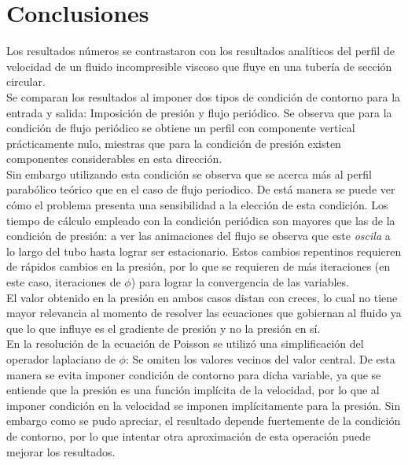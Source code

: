 \section{Conclusiones}

Los resultados números se contrastaron con los resultados analíticos del perfil de velocidad de un fluido incompresible viscoso que fluye en una tubería de sección circular. \\

Se comparan los resultados al imponer dos tipos de condición de contorno para la entrada y salida: Imposición de presión y flujo periódico. Se observa que para la condición de flujo periódico se obtiene un perfil con componente vertical prácticamente nulo, miestras que para la condición de presión existen componentes considerables en esta dirección. \\

Sin embargo utilizando esta condición se observa que se acerca más al perfil parabólico teórico que en el caso de flujo periodico. De está manera se puede ver cómo el problema presenta una sensibilidad a la elección de esta condición. Los tiempo de cálculo empleado con la condición periódica son mayores que las de la condición de presión: a ver las animaciones del flujo se observa que este \textit{oscila} a lo largo del tubo hasta lograr ser estacionario. Estos cambios repentinos requieren de rápidos cambios en la presión, por lo que se requieren de más iteraciones (en este caso, iteraciones de $\phi$) para lograr la convergencia de las variables. \\ 

El valor obtenido en la presión en ambos casos distan con creces, lo cual no tiene mayor relevancia al momento de resolver las ecuaciones que gobiernan al fluido ya que lo que influye es el gradiente de presión y no la presión en sí.\\

En la resolución de la ecuación de Poisson se utilizó una simplificación del operador laplaciano de $\phi$: Se omiten los valores vecinos del valor central. De esta manera se evita imponer condición de contorno para dicha variable, ya que se entiende que la presión es una función implícita de la velocidad, por lo que al imponer condición en la velocidad se imponen implícitamente para la presión. Sin embargo como se pudo apreciar, el resultado depende fuertemente de la condición de contorno, por lo que intentar otra aproximación de esta operación puede mejorar los resultados. \\
